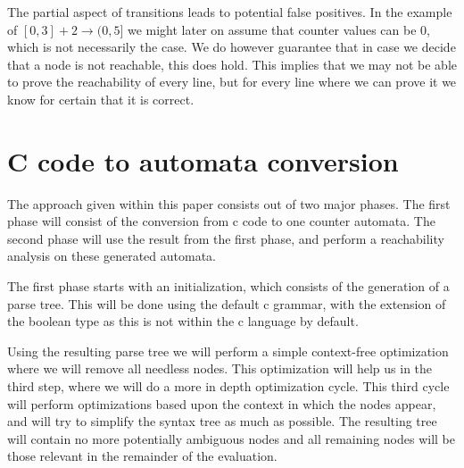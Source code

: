 \documentclass[12pt]{article}
\begin{document}
The partial aspect of transitions leads to potential false positives. In the example of $[0, 3] + 2 \rightarrow (0, 5]$ we might later on assume that counter values can be 0, which is not necessarily the case. We do however guarantee that in case we decide that a node is not reachable, this does hold. This implies that we may not be able to prove the reachability of every line, but for every line where we can prove it we know for certain that it is correct.

\section{C code to automata conversion}

The approach given within this paper consists out of two major phases. The first phase will consist of the conversion from c code to one counter automata. The second phase will use the result from the first phase, and perform a reachability analysis on these generated automata.

\begin{figure}[t]
\end{figure}

The first phase starts with an initialization, which consists of the generation of a parse tree. This will be done using the default c grammar, with the extension of the boolean type as this is not within the c language by default.

Using the resulting parse tree we will perform a simple context-free optimization where we will remove all needless nodes. This optimization will help us in the third step, where we will do a more in depth optimization cycle. This third cycle will perform optimizations based upon the context in which the nodes appear, and will try to simplify the syntax tree as much as possible. The resulting tree will contain no more potentially ambiguous nodes and all remaining nodes will be those relevant in the remainder of the evaluation.
\end{document}
